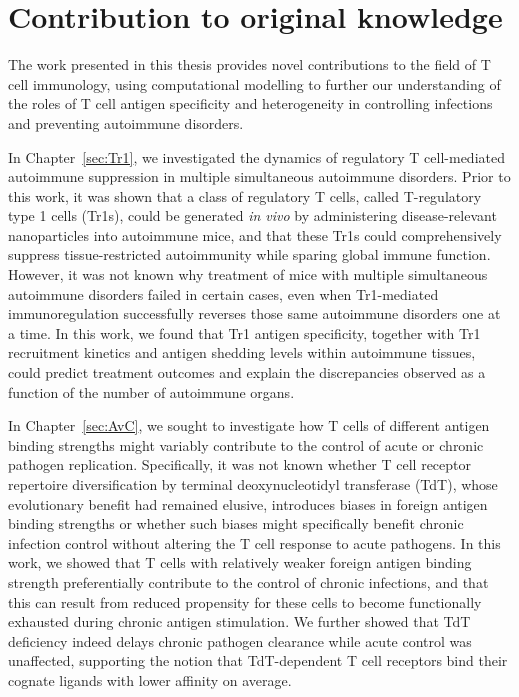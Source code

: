 \chapter*{Contribution to original knowledge}

\hypersetup{linkcolor=seccolor}

The work presented in this thesis provides novel contributions to the field of T cell immunology, using computational modelling to further our understanding of the roles of T cell antigen specificity and heterogeneity in controlling infections and preventing autoimmune disorders.

In Chapter~\ref{sec:Tr1}, we investigated the dynamics of regulatory T cell-mediated autoimmune suppression in multiple simultaneous autoimmune disorders. Prior to this work, it was shown that a class of regulatory T cells, called T-regulatory type 1 cells (Tr1s), could be generated \textit{in vivo} by administering disease-relevant nanoparticles into autoimmune mice, and that these Tr1s could comprehensively suppress tissue-restricted autoimmunity while sparing global immune function. However, it was not known why treatment of mice with multiple simultaneous autoimmune disorders failed in certain cases, even when Tr1-mediated immunoregulation successfully reverses those same autoimmune disorders one at a time. In this work, we found that Tr1 antigen specificity, together with Tr1 recruitment kinetics and antigen shedding levels within autoimmune tissues, could predict treatment outcomes and explain the discrepancies observed as a function of the number of autoimmune organs.

In Chapter~\ref{sec:AvC}, we sought to investigate how T cells of different antigen binding strengths might variably contribute to the control of acute or chronic pathogen replication. Specifically, it was not known whether T cell receptor repertoire diversification by terminal deoxynucleotidyl transferase (TdT), whose evolutionary benefit had remained elusive, introduces biases in foreign antigen binding strengths or whether such biases might specifically benefit chronic infection control without altering the T cell response to acute pathogens. In this work, we showed that T cells with relatively weaker foreign antigen binding strength preferentially contribute to the control of chronic infections, and that this can result from reduced propensity for these cells to become functionally exhausted during chronic antigen stimulation. We further showed that TdT deficiency indeed delays chronic pathogen clearance while acute control was unaffected, supporting the notion that TdT-dependent T cell receptors bind their cognate ligands with lower affinity on average.

